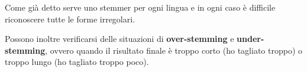 Come già detto serve uno stemmer per ogni lingua e in ogni caso è difficile riconoscere tutte le forme irregolari.

Possono inoltre verificarsi delle situazioni di \textbf{over-stemming} e \textbf{under-stemming}, ovvero quando il risultato finale è troppo corto (ho tagliato troppo) o troppo lungo (ho tagliato troppo poco).













